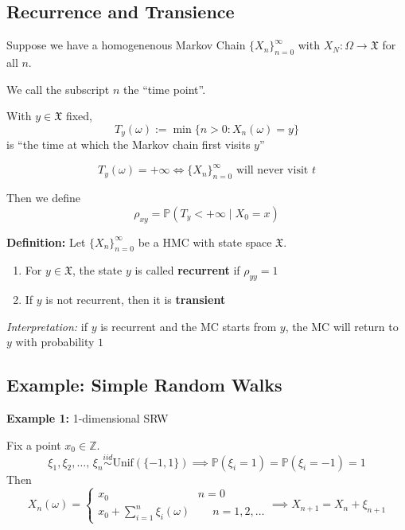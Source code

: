 \documentclass[12pt]{article}
\renewcommand{\P}{\mathbb{P}}
\newcommand{\mfX}{\mathfrak{X}}
\newcommand{\Z}{\mathbb{Z}}
\begin{document}
\subsection*{Recurrence and Transience}
Suppose we have a homogenenous Markov Chain $\{X_n\}_{n=0}^\infty$ with $X_N: \Omega \to \mfX$ for all $n$.

\begin{center}
    \color{blue}
\end{center}

We call the subscript $n$ the ``time point''. 

With $y \in \mfX$ fixed, 
\[T_y(\omega) := \min\{n > 0: X_n(\omega) = y\}\]
is ``the time at which the Markov chain first visits $y$''

\[T_y(\omega) = +\infty \iff \{X_n\}_{n=0}^\infty \text{ will never visit $t$}\]

Then we define 
\[\rho_{xy} = \P(T_y < +\infty \; | \; X_0 = x)\]

\textbf{Definition:} Let $\{X_n\}_{n=0}^\infty$ be a HMC with state space $\mfX$. 
\begin{enumerate}
    \item For $y \in \mfX$, the state $y$ is called \textbf{recurrent} if $\rho_{yy} = 1$
    \item If $y$ is not recurrent, then it is \textbf{transient}
\end{enumerate}

\emph{Interpretation:} if $y$ is recurrent and the MC starts from $y$, the MC will return to $y$ with probability $1$

\subsection*{Example: Simple Random Walks}
\textbf{Example 1:} 1-dimensional SRW 

Fix a point $x_0 \in \Z$. 
\[\xi_1, \xi_2, \dots,\, \xi_n \overset{iid}{\sim} \text{Unif}(\{-1, 1\}) \implies \P(\xi_i = 1) = \P(\xi_i = -1) = 1\]
Then 
\[X_n(\omega) = \begin{cases}
    x_0 \qquad\qquad \qquad\qquad\!  n = 0\\
    x_0 + \sum_{i=1}^n \xi_i(\omega) \qquad n = 1, 2, \dots
\end{cases} \implies X_{n+1} = X_n + \xi_{n+1}\]
\end{document}
